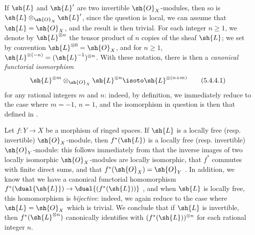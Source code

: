 \begin{env}[5.4.4]
\label{0.5.4.4}
If $\sh{L}$ and $\sh{L}'$ are two invertible $\sh{O}_X$-modules, then so is $\sh{L}\otimes_{\sh{O}_X}\sh{L}'$, since the question is local, we can assume that $\sh{L}=\sh{O}_X$, and the result is then trivial.
For each integer $n\geq 1$, we denote by $\sh{L}^{\otimes n}$ the tensor product of $n$ copies of the sheaf
$\sh{L}$; we set by convention $\sh{L}^{\otimes 0}=\sh{O}_X$, and for $n\geq 1$, $\sh{L}^{\otimes(-n)}=(\sh{L}^{-1})^{\otimes n}$.
With these notation, there is then a \emph{canonical functorial isomorphism}
\[
  \sh{L}^{\otimes m}\otimes_{\sh{O}_X}\sh{L}^{\otimes n}\isoto\sh{L}^{\otimes(n+m)}
  \tag{5.4.4.1}\label{0.5.4.4.1}
\]
for any rational integers $m$ and $n$:
indeed, by definition, we immediately reduce to the case where $m=-1$, $n=1$, and the isomorphism in question is then that defined in .
\end{env}

\begin{env}[5.4.5]
\label{0.5.4.5}
Let $f:Y\to X$ be a morphism of ringed spaces.
If $\sh{L}$ is a locally free (resp. invertible) $\sh{O}_X$-module, then $f^*(\sh{L})$ is a locally free (resp. invertible) $\sh{O}_Y$-module:
this follows immediately from that the inverse images of two locally isomorphic $\sh{O}_X$-modules are locally isomorphic, that $f^*$ commutes with finite direct sums, and that $f^*(\sh{O}_X)=\sh{O}_Y$ .
In addition, we know that we have a canonical functorial homomorphism $f^*(\dual{\sh{L}})\to\dual{(f^*(\sh{L}))}$ , and when $\sh{L}$ is locally free, this homomorphism is \emph{bijective}:
indeed, we again reduce to the case where $\sh{L}=\sh{O}_X$ which is trivial.
We conclude that if $\sh{L}$ is invertible, then $f^*(\sh{L}^{\otimes n})$ canonically identifies with $(f^*(\sh{L}))^{\otimes n}$ for each rational integer $n$.
\end{env}

